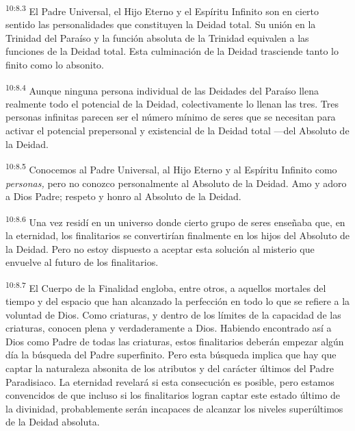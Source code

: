 \par
\textsuperscript{10:8.3} El Padre Universal, el Hijo Eterno y el Espíritu Infinito son en cierto sentido las personalidades que constituyen la Deidad total. Su unión en la Trinidad del Paraíso y la función absoluta de la Trinidad equivalen a las funciones de la Deidad total. Esta culminación de la Deidad trasciende tanto lo finito como lo absonito.

\par
\textsuperscript{10:8.4} Aunque ninguna persona individual de las Deidades del Paraíso llena realmente todo el potencial de la Deidad, colectivamente lo llenan las tres. Tres personas infinitas parecen ser el número mínimo de seres que se necesitan para activar el potencial prepersonal y existencial de la Deidad total ---del Absoluto de la Deidad.

\par
\textsuperscript{10:8.5} Conocemos al Padre Universal, al Hijo Eterno y al Espíritu Infinito como \textit{personas,} pero no conozco personalmente al Absoluto de la Deidad. Amo y adoro a Dios Padre; respeto y honro al Absoluto de la Deidad.

\par
\textsuperscript{10:8.6} Una vez residí en un universo donde cierto grupo de seres enseñaba que, en la eternidad, los finalitarios se convertirían finalmente en los hijos del Absoluto de la Deidad. Pero no estoy dispuesto a aceptar esta solución al misterio que envuelve al futuro de los finalitarios.

\par
\textsuperscript{10:8.7} El Cuerpo de la Finalidad engloba, entre otros, a aquellos mortales del tiempo y del espacio que han alcanzado la perfección en todo lo que se refiere a la voluntad de Dios. Como criaturas, y dentro de los límites de la capacidad de las criaturas, conocen plena y verdaderamente a Dios. Habiendo encontrado así a Dios como Padre de todas las criaturas, estos finalitarios deberán empezar algún día la búsqueda del Padre superfinito. Pero esta búsqueda implica que hay que captar la naturaleza absonita de los atributos y del carácter últimos del Padre Paradisiaco. La eternidad revelará si esta consecución es posible, pero estamos convencidos de que incluso si los finalitarios logran captar este estado último de la divinidad, probablemente serán incapaces de alcanzar los niveles superúltimos de la Deidad absoluta.

